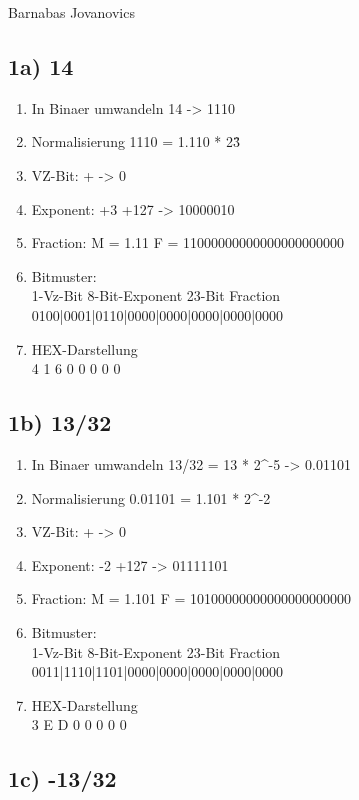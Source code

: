 \documentclass[]{article}
\date{}
\providecommand{\tightlist}{%
  \setlength{\itemsep}{0pt}\setlength{\parskip}{0pt}}
\begin{document}
Barnabas Jovanovics

\subsection{1a) 14}\label{a-14}

\begin{enumerate}
\tightlist
\item
  In Binaer umwandeln 14 -> 1110
\item
  Normalisierung 1110 = 1.110 * 2\^{3}
\item
  VZ-Bit: + -> 0
\item
  Exponent: +3 +127 -> 10000010
\item
  Fraction: M = 1.11 F = 11000000000000000000000
\item
  Bitmuster:\\
  1-Vz-Bit 8-Bit-Exponent 23-Bit Fraction\\
  0100|0001|0110|0000|0000|0000|0000|0000
\item
  HEX-Darstellung\\
  4 1 6 0 0 0 0 0
\end{enumerate}

\subsection{1b) 13/32}\label{b-1332}

\begin{enumerate}
\tightlist
\item
  In Binaer umwandeln 13/32 = 13 * 2\^{}-5 -> 0.01101
\item
  Normalisierung 0.01101 = 1.101 * 2\^{}-2
\item
  VZ-Bit: + -> 0
\item
  Exponent: -2 +127 -> 01111101
\item
  Fraction: M = 1.101 F = 10100000000000000000000
\item
  Bitmuster:\\
  1-Vz-Bit 8-Bit-Exponent 23-Bit Fraction\\
  0011|1110|1101|0000|0000|0000|0000|0000
\item
  HEX-Darstellung\\
  3 E D 0 0 0 0 0
\end{enumerate}

\subsection{1c) -13/32}\label{c--1332}
\end{document}
